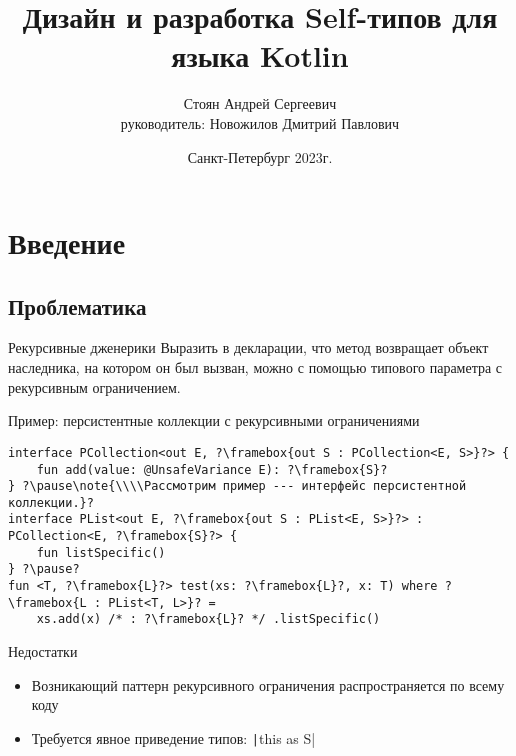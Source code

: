 \documentclass[aspectratio=169,usenames,dvipsnames]{beamer}
\author[Андрей Стоян]{Стоян Андрей Сергеевич\\ {\footnotesize руководитель:} Новожилов Дмитрий Павлович}
\institute[ИТМО/SE]{Университет ИТМО\\Разработка программного обеспечения/Software engineering}
\title[Дизайн и разработка Self-типов для языка Kotlin]{Дизайн и разработка Self-типов для языка Kotlin}
\date{Санкт-Петербург 2023г.}
\begin{document}
    \maketitle



    \section{Введение}

    \subsection{Проблематика}

    \begin{frame}[fragile]{Рекурсивные дженерики}
        Выразить в декларации, что метод возвращает объект наследника, на котором он был вызван, можно с помощью типового параметра с рекурсивным ограничением.
        \pause{}

        \begin{block}{Пример: персистентные коллекции с рекурсивными ограничениями}
            \begin{verbatim}
interface PCollection<out E, ?\framebox{out S : PCollection<E, S>}?> {
    fun add(value: @UnsafeVariance E): ?\framebox{S}?
} ?\pause\note{\\\\Рассмотрим пример --- интерфейс персистентной коллекции.}?
interface PList<out E, ?\framebox{out S : PList<E, S>}?> : PCollection<E, ?\framebox{S}?> {
    fun listSpecific()
} ?\pause?
fun <T, ?\framebox{L}?> test(xs: ?\framebox{L}?, x: T) where ?\framebox{L : PList<T, L>}? =
    xs.add(x) /* : ?\framebox{L}? */ .listSpecific()
            \end{verbatim}
        \end{block}

        \begin{block}{Недостатки}
            \begin{itemize}
                \item Возникающий паттерн рекурсивного ограничения распространяется по всему коду
                \item Требуется явное приведение типов: \texttt|this as S|
            \end{itemize}
        \end{block}
    \end{frame}
\end{document}
